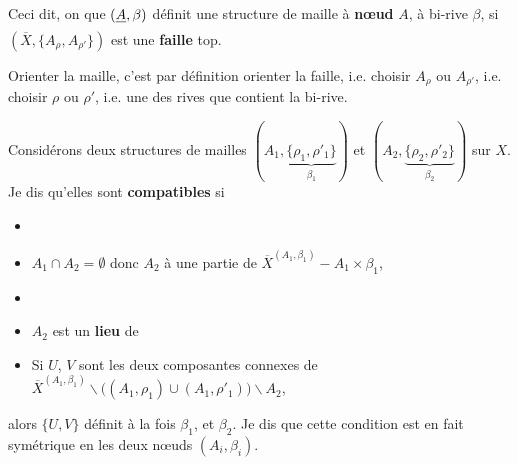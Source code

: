 \documentclass[11pt,a4paper]{article}
\begin{document}
Ceci dit, on  que $(\struck{A}, \beta)$ définit  une structure de maille à \textbf{nœud} $A$, à \struck{\ill{}} bi-rive $\beta$,  si $(\overline{X}, \{A_\rho, A_{\rho'}\})$ est une \textbf{faille} top.

Orienter la maille, c'est par définition orienter la faille, i.e. choisir $A_\rho$ ou $A_{\rho'}$, i.e. choisir $\rho$ ou $\rho'$, i.e. une des rives que contient la bi-rive.


  Considérons deux \struck{\ill{}} structures de mailles $(A_1, \underbrace{\{\rho_1, \rho'_1\}}_{\beta_1})$ et $(A_2, \underbrace{\{\rho_2, \rho'_2\}}_{\beta_2})$ sur $X$. Je dis qu'elles sont \struck{\ill{}}  \textbf{compatibles} \struck{\ill{}} si
\begin{itemize}
  \item[\struck{a)}] 
  \item[a)] $A_1 \cap A_2 = \emptyset$ donc $A_2$   à une partie de $\overline{X}^{(A_1,\beta_1)} - A_1 \times \beta_1$,
  \item[\struck{b)}] 
  \item[b)] $A_2$ est un \textbf{lieu} de 
  \item[c)] Si $U$, $V$ sont les deux composantes connexes de $\overline{X}^{(A_1,\beta_1)} \smallsetminus \bigl((A_1, \rho_1) \cup (A_1, \rho'_1)\bigr) \smallsetminus A_2$,
\end{itemize}

alors $\{U, V\}$ définit à la fois \struck{\ill{}} $\beta_1$, et $\beta_2$. Je dis que cette condition est en fait symétrique en les deux nœuds $(A_i, \beta_i)$.
\end{document}
